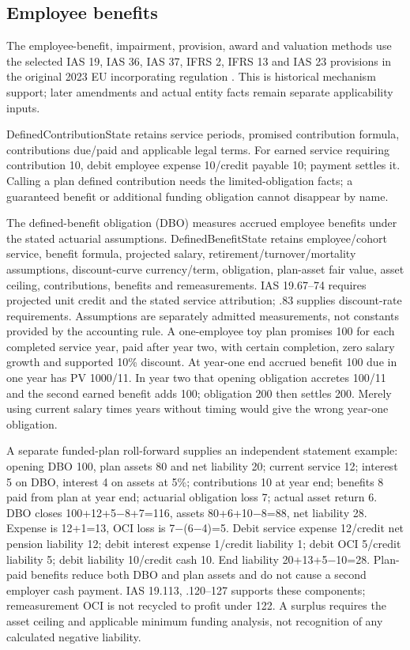 \hypertarget{employee-benefits}{%
\subsection{Employee benefits}\label{method-corporate-extensions-employee-benefits}}

The employee-benefit, impairment, provision, award and valuation methods use the selected IAS 19, IAS 36, IAS 37, IFRS 2, IFRS 13 and IAS 23 provisions in the original 2023 EU incorporating regulation \citep{eu20231803}. This is historical mechanism support; later amendments and actual entity facts remain separate applicability inputs.

DefinedContributionState retains service periods, promised contribution formula, contributions due/paid and applicable legal terms. For earned service requiring contribution 10, debit employee expense 10/credit payable 10; payment settles it. Calling a plan defined contribution needs the limited-obligation facts; a guaranteed benefit or additional funding obligation cannot disappear by name.

The defined-benefit obligation (DBO) measures accrued employee benefits under the stated actuarial assumptions. DefinedBenefitState retains employee/cohort service, benefit formula, projected salary, retirement/turnover/mortality assumptions, discount-curve currency/term, obligation, plan-asset fair value, asset ceiling, contributions, benefits and remeasurements. IAS 19.67--74 requires projected unit credit and the stated service attribution; .83 supplies discount-rate requirements. Assumptions are separately admitted measurements, not constants provided by the accounting rule. A one-employee toy plan promises 100 for each completed service year, paid after year two, with certain completion, zero salary growth and supported 10\% discount. At year-one end accrued benefit 100 due in one year has PV 1000/11. In year two that opening obligation accretes 100/11 and the second earned benefit adds 100; obligation 200 then settles 200. Merely using current salary times years without timing would give the wrong year-one obligation.

A separate funded-plan roll-forward supplies an independent statement example: opening DBO 100, plan assets 80 and net liability 20; current service 12; interest 5 on DBO, interest 4 on assets at 5\%; contributions 10 at year end; benefits 8 paid from plan at year end; actuarial obligation loss 7; actual asset return 6. DBO closes 100+12+5\ensuremath{-}8+7=116, assets 80+6+10\ensuremath{-}8=88, net liability 28. Expense is 12+1=13, OCI loss is 7\ensuremath{-}(6\ensuremath{-}4)=5. Debit service expense 12/credit net pension liability 12; debit interest expense 1/credit liability 1; debit OCI 5/credit liability 5; debit liability 10/credit cash 10. End liability 20+13+5\ensuremath{-}10=28. Plan-paid benefits reduce both DBO and plan assets and do not cause a second employer cash payment. IAS 19.113, .120--127 supports these components; remeasurement OCI is not recycled to profit under 122. A surplus requires the asset ceiling and applicable minimum funding analysis, not recognition of any calculated negative liability.


